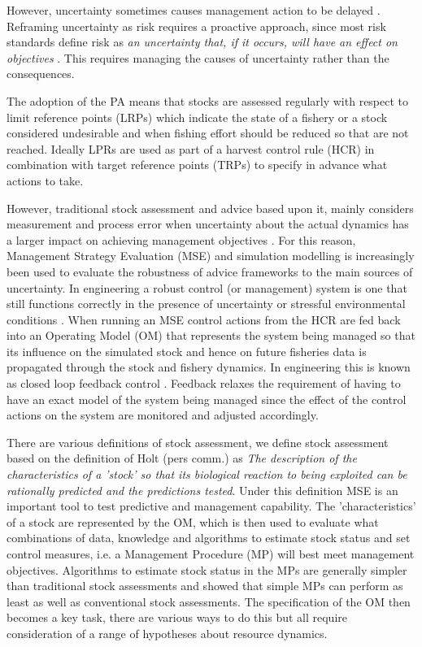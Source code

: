 \documentclass[%
nonumbib,      %
%
]{nrc1}                          %
\begin{document}
However, uncertainty sometimes causes management action to be delayed \citep{fromentin2014spectre}. Reframing uncertainty as risk requires a proactive approach, since  most risk standards define risk as \textit{an uncertainty that, if it occurs, will have an effect on objectives} \citep{hillson2011risk}. This requires managing the causes of uncertainty rather than the consequences.

The adoption of the PA means that stocks are assessed regularly with respect to limit reference points (LRPs) which indicate the state of a fishery or a stock considered undesirable and when fishing effort should be reduced so that are not reached. Ideally LPRs are used as part of a harvest control rule (HCR) in combination with target reference points (TRPs) to specify in advance what actions to take.  

However, traditional stock assessment and advice based upon it, mainly considers measurement and process error when uncertainty about the actual dynamics has a larger impact on achieving management objectives \citep{punt2008refocusing}. For this reason, Management Strategy Evaluation (MSE) and simulation modelling is increasingly been used to evaluate the robustness of advice frameworks to the main sources of uncertainty. In engineering a robust control (or management) system is one that still functions correctly in the presence of uncertainty or stressful environmental conditions \citep{radatz1990ieee}. When running an MSE control actions from the HCR are fed back into an Operating Model (OM) that represents the system being managed so that its influence on the simulated stock and hence on future fisheries data is propagated through the stock and fishery dynamics. In engineering this is known as closed loop feedback control \citep{zhou1996robust}. Feedback relaxes the requirement of having to have an exact model of the system being managed since the effect of the control actions on the system are monitored and adjusted accordingly.

There are various definitions of stock assessment, we define stock assessment based on the definition of Holt (pers comm.) as \textit{The description of the characteristics of a 'stock' so that its biological reaction to being exploited can be rationally predicted and the predictions tested}.  Under this definition MSE is an important tool to test predictive and management capability. The 'characteristics' of a stock are represented by the OM, which is then used to evaluate what combinations of data, knowledge and algorithms to estimate stock status and set control measures, i.e. a Management Procedure (MP) will best meet management objectives. Algorithms to estimate stock status in the MPs are generally simpler than traditional stock assessments and \citep{geromont2014generic} showed that simple MPs can perform as least as well as conventional stock assessments. The specification of the OM then becomes a key task, there are various ways to do this \citep{kell2006operational} but all require consideration of a range of hypotheses about resource dynamics. 
\end{document}
